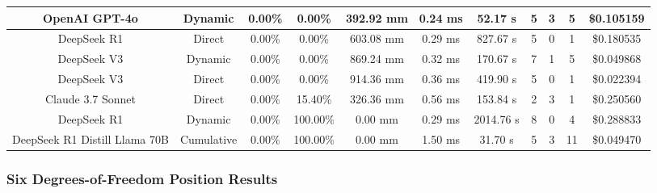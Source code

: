 \begin{landscape}
\begin{table}[H]
\begin{center}
\begin{tabular}{|c|c|c|c|c|c|c|c|c|c|c|}
    \hline
    OpenAI GPT-4o & Dynamic & 0.00\% & 0.00\% & 392.92 mm & 0.24 ms & 52.17 s & 5 & 3 & 5 & \$0.105159 \\
    \hline
    DeepSeek R1 & Direct & 0.00\% & 0.00\% & 603.08 mm & 0.29 ms & 827.67 s & 5 & 0 & 1 & \$0.180535 \\
    \hline
    DeepSeek V3 & Dynamic & 0.00\% & 0.00\% & 869.24 mm & 0.32 ms & 170.67 s & 7 & 1 & 5 & \$0.049868 \\
    \hline
    DeepSeek V3 & Direct & 0.00\% & 0.00\% & 914.36 mm & 0.36 ms & 419.90 s & 5 & 0 & 1 & \$0.022394 \\
    \hline
    Claude 3.7 Sonnet & Direct & 0.00\% & 15.40\% & 326.36 mm & 0.56 ms & 153.84 s & 2 & 3 & 1 & \$0.250560 \\
    \hline
    DeepSeek R1 & Dynamic & 0.00\% & 100.00\% & 0.00 mm & 0.29 ms & 2014.76 s & 8 & 0 & 4 & \$0.288833 \\
    \hline
    DeepSeek R1 Distill Llama 70B & Cumulative & 0.00\% & 100.00\% & 0.00 mm & 1.50 ms & 31.70 s & 5 & 3 & 11 & \$0.049470 \\
    \hline
\end{tabular}
\label{Results-Position-2-6}
\end{center}
\end{table}

\subsubsection{Six Degrees-of-Freedom Position Results}


\end{landscape}
